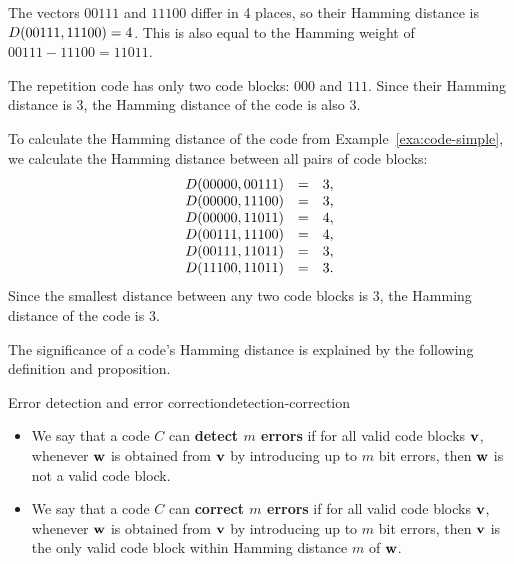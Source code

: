 \begin{solution}
  The vectors $00111$ and $11100$ differ in 4 places, so their Hamming
  distance is $D(00111,11100)=4$. This is also equal to the Hamming
  weight of $00111-11100 = 11011$.

  The repetition code has only two code blocks: $000$ and
  $111$. Since their Hamming distance is 3, the Hamming distance of
  the code is also 3.

  To calculate the Hamming distance of the code from
  Example~\ref{exa:code-simple}, we calculate the Hamming distance
  between all pairs of code blocks:
  \begin{equation*}
    \begin{array}{rcl}
      D(00000,00111) &=& 3, \\
      D(00000,11100) &=& 3, \\
      D(00000,11011) &=& 4, \\
      D(00111,11100) &=& 4, \\
      D(00111,11011) &=& 3, \\
      D(11100,11011) &=& 3. \\
    \end{array}
  \end{equation*}
  Since the smallest distance between any two code blocks is $3$, the
  Hamming distance of the code is $3$.
\end{solution}

The significance of a code's Hamming distance is explained by the
following definition and proposition.

\begin{definition}{Error detection and error correction}{detection-correction}
  \begin{itemize}
  \item We say that a code $C$ can \textbf{detect $m$ errors}%
     if for all valid code blocks $\mbox{\bf v}$,
    whenever\/ $\mbox{\bf w}$ is obtained from $\mbox{\bf v}$ by introducing up
    to $m$ bit errors, then $\mbox{\bf w}$ is not a valid code block.
  \item We say that a code $C$ can \textbf{correct $m$ errors}%
     if for all valid code blocks $\mbox{\bf v}$,
    whenever\/ $\mbox{\bf w}$ is obtained from $\mbox{\bf v}$ by introducing up
    to $m$ bit errors, then $\mbox{\bf v}$ is the only valid code block
    within Hamming distance $m$ of $\mbox{\bf w}$.
  \end{itemize}  
\end{definition}

